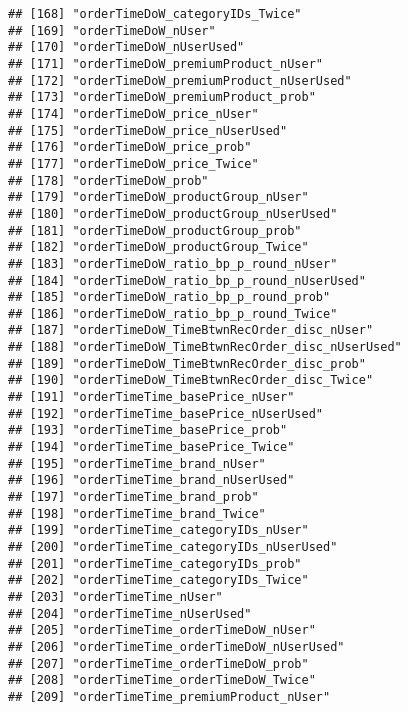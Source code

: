\documentclass[10pt]{report}
\begin{document}
\begin{verbatim}
## [168] "orderTimeDoW_categoryIDs_Twice"                     
## [169] "orderTimeDoW_nUser"                                 
## [170] "orderTimeDoW_nUserUsed"                             
## [171] "orderTimeDoW_premiumProduct_nUser"                  
## [172] "orderTimeDoW_premiumProduct_nUserUsed"              
## [173] "orderTimeDoW_premiumProduct_prob"                   
## [174] "orderTimeDoW_price_nUser"                           
## [175] "orderTimeDoW_price_nUserUsed"                       
## [176] "orderTimeDoW_price_prob"                            
## [177] "orderTimeDoW_price_Twice"                           
## [178] "orderTimeDoW_prob"                                  
## [179] "orderTimeDoW_productGroup_nUser"                    
## [180] "orderTimeDoW_productGroup_nUserUsed"                
## [181] "orderTimeDoW_productGroup_prob"                     
## [182] "orderTimeDoW_productGroup_Twice"                    
## [183] "orderTimeDoW_ratio_bp_p_round_nUser"                
## [184] "orderTimeDoW_ratio_bp_p_round_nUserUsed"            
## [185] "orderTimeDoW_ratio_bp_p_round_prob"                 
## [186] "orderTimeDoW_ratio_bp_p_round_Twice"                
## [187] "orderTimeDoW_TimeBtwnRecOrder_disc_nUser"           
## [188] "orderTimeDoW_TimeBtwnRecOrder_disc_nUserUsed"       
## [189] "orderTimeDoW_TimeBtwnRecOrder_disc_prob"            
## [190] "orderTimeDoW_TimeBtwnRecOrder_disc_Twice"           
## [191] "orderTimeTime_basePrice_nUser"                      
## [192] "orderTimeTime_basePrice_nUserUsed"                  
## [193] "orderTimeTime_basePrice_prob"                       
## [194] "orderTimeTime_basePrice_Twice"                      
## [195] "orderTimeTime_brand_nUser"                          
## [196] "orderTimeTime_brand_nUserUsed"                      
## [197] "orderTimeTime_brand_prob"                           
## [198] "orderTimeTime_brand_Twice"                          
## [199] "orderTimeTime_categoryIDs_nUser"                    
## [200] "orderTimeTime_categoryIDs_nUserUsed"                
## [201] "orderTimeTime_categoryIDs_prob"                     
## [202] "orderTimeTime_categoryIDs_Twice"                    
## [203] "orderTimeTime_nUser"                                
## [204] "orderTimeTime_nUserUsed"                            
## [205] "orderTimeTime_orderTimeDoW_nUser"                   
## [206] "orderTimeTime_orderTimeDoW_nUserUsed"               
## [207] "orderTimeTime_orderTimeDoW_prob"                    
## [208] "orderTimeTime_orderTimeDoW_Twice"                   
## [209] "orderTimeTime_premiumProduct_nUser"                 

\end{verbatim}
\end{document}
